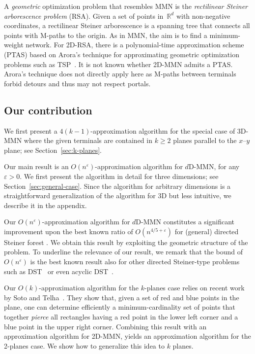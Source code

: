 \documentclass[11pt]{llncs}
\newcommand{\R}{\ensuremath{\mathbb{R}}}
\newcommand{\eps}{\ensuremath{\varepsilon}\xspace}
\begin{document}
A \emph{geometric} optimization problem that resembles MMN
is the \emph{rectilinear Steiner arborescence problem} (RSA).
Given a set of points in~$\R^d$ with non-negative coordinates, a
rectilinear Steiner arborescence is a spanning tree 
that connects all points with M-paths to the origin.  As in MMN, the
aim is to find a minimum-weight network.  For 2D-RSA, there is a 
polynomial-time approximation scheme (PTAS)
\cite{lr-ptasrsap-00} based on Arora's technique for approximating
geometric optimization problems such as TSP~\cite{a-asnph-03}.   
It is not known whether 2D-MMN admits a PTAS.  
Arora's technique 
does not directly apply here as M-paths between terminals
forbid detours and thus may not respect portals.  




\subsection{Our contribution}  


We first present a $4(k-1)$-approximation algorithm for the special
case of 3D-MMN where the given terminals are contained in $k \ge 2$
planes parallel to the $x$--$y$ plane; see Section~\ref{sec:k-planes}.

Our main result is an $O(n^\eps)$-approximation algorithm for
$d$D-MMN, for any $\eps>0$.  We first present the algorithm in detail
for three dimensions; see Section~\ref{sec:general-case}.  Since the
algorithm for arbitrary 
dimensions is a straightforward generalization of the algorithm for 3D
but less intuitive, we describe it in the appendix.

Our $O(n^\eps)$-approximation algorithm for $d$D-MMN constitutes a
significant improvement 
upon the best known ratio of $O(n^{4/5+\eps})$ for (general) directed
Steiner forest \cite{fkn-iaadsf-09}. We obtain this result by
exploiting the geometric structure of the problem.  To underline the
relevance of our result, we remark that the bound of $O(n^\eps)$ is the
best known result also for other directed Steiner-type problems such
as DST~\cite{cccdggl-aadsp-98} or even acyclic
DST~\cite{zelikovsky-adstapprox-97}. 

Our $O(k)$-approximation algorithm for the $k$-planes case relies on
recent work by Soto and Telha~\cite{st-2dorg-11}.
They show that, given a set of red and blue points in the plane, one
can determine efficiently a minimum-cardinality set of points that
together \emph{pierce} all rectangles having a red point in the lower
left corner and a blue point in the upper right corner. Combining this
result with an approximation algorithm for 2D-MMN, 
yields an approximation algorithm for the 2-planes case.  We show how to
generalize this idea to $k$ planes.
\end{document}
